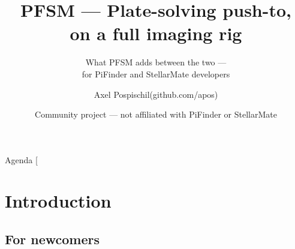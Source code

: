 \documentclass[12pt,english,aspectratio=1609]{beamer}
\makeatletter
\newcommand\makebeamertitle{\frame{\maketitle}}%
\let\origtableofcontents=\tableofcontents
\def\tableofcontents{\@ifnextchar[{\origtableofcontents}{\gobbletableofcontents}}
\def\gobbletableofcontents#1{\origtableofcontents}
\newif\ifPFSMlight
\makeatother
\begin{document}
\ifPFSMlight
  \AVVPLightMode
  \AVVPFootlineLight
  \AVVPBgFillWidth{pics/AVVPBg_light.png}{0}{0}
\else
  \AVVPDarkMode
  \AVVPFootlineDark
\fi

\title[PiFinder\_Stellarmate]{PFSM — Plate-solving push-to,\\
on a full imaging rig}
\subtitle{What PFSM adds between the two —\\
for PiFinder and StellarMate developers}
\author[Axel Pospischil]{Axel Pospischil\enskip(github.com/apos)}
\date[github.com/apos]{Community project — not affiliated with PiFinder or StellarMate}

\makebeamertitle

\AVVPAgendaOnlySections   %

\begin{frame}{Agenda}
\tableofcontents{}
\end{frame}

\section{Introduction}

\subsection{For newcomers}
\end{document}
